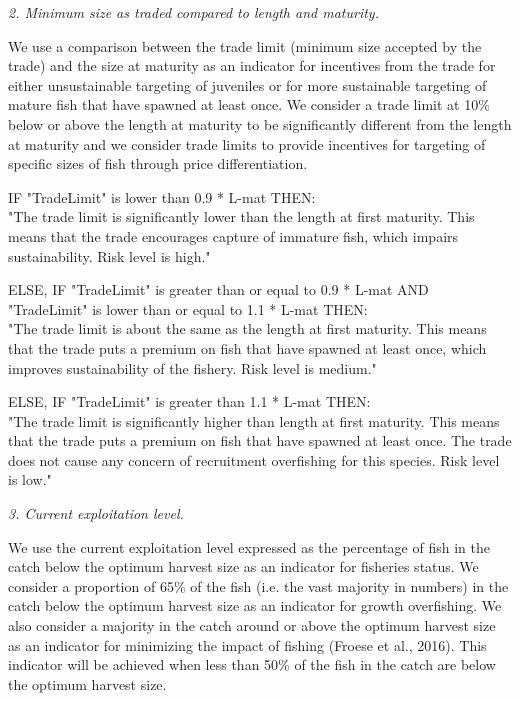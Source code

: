 \textit{2. Minimum size as traded compared to length and maturity.}

We use a comparison between the trade limit (minimum size accepted by the trade) and the size at maturity as an indicator for incentives from the trade for either unsustainable targeting of juveniles or for more sustainable targeting of mature fish that have spawned at least once. We consider a trade limit at 10\% below or above the length at maturity to be significantly different from the length at maturity and we consider trade limits to provide incentives for targeting of specific sizes of fish through price differentiation.

IF "TradeLimit" is lower than 0.9 * L-mat THEN:\\[0cm]
"The trade limit is significantly lower than the length at first maturity.  This means that the trade encourages capture of immature fish, which impairs sustainability. Risk level is high."

\clearpage
\newpage

ELSE, IF "TradeLimit" is greater than or equal to 0.9 * L-mat AND "TradeLimit" is lower than or equal to 1.1 * L-mat THEN:\\[0cm]
"The trade limit is about the same as the length at first maturity.  This means that the trade puts a premium on fish that have spawned at least once, which improves sustainability of the fishery. Risk level is medium."

ELSE, IF "TradeLimit" is greater than 1.1 * L-mat THEN:\\[0cm]
"The trade limit is significantly higher than length at first maturity.  This means that the trade puts a premium on fish that have spawned at least once. The trade does not cause any concern of recruitment overfishing for this species. Risk level is low."

\textit{3. Current exploitation level.}

We use the current exploitation level expressed as the percentage of fish in the catch below the optimum harvest size as an indicator for fisheries status. We consider a proportion of 65\% of the fish (i.e. the vast majority in numbers) in the catch below the optimum harvest size as an indicator for growth overfishing. We also consider a majority in the catch around or above the optimum harvest size as an indicator for minimizing the impact of fishing (Froese et al., 2016). This indicator will be achieved when less than 50\% of the fish in the catch are below the optimum harvest size.

